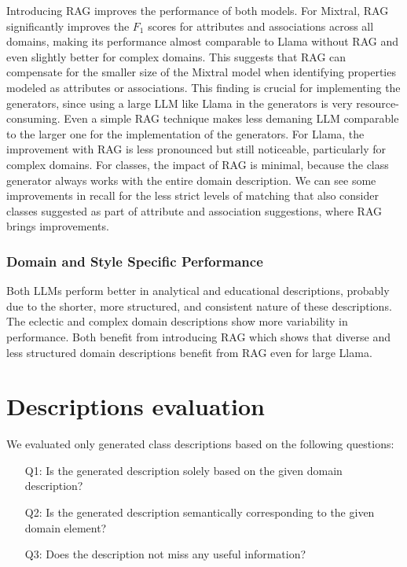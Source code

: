 Introducing RAG improves the performance of both models.
For Mixtral, RAG significantly improves the $F_1$ scores for attributes and associations across all domains, making its performance almost comparable to Llama without RAG and even slightly better for complex domains.
This suggests that RAG can compensate for the smaller size of the Mixtral model when identifying properties modeled as attributes or associations.
This finding is crucial for implementing the generators, since using a large LLM like Llama in the generators is very resource-consuming.
Even a simple RAG technique makes less demaning LLM comparable to the larger one for the implementation of the generators.
For Llama, the improvement with RAG is less pronounced but still noticeable, particularly for complex domains.
For classes, the impact of RAG is minimal, because the class generator always works with the entire domain description.
We can see some improvements in recall for the less strict levels of matching that also consider classes suggested as part of attribute and association suggestions, where RAG brings improvements.


\subsubsection{Domain and Style Specific Performance}

Both LLMs perform better in analytical and educational descriptions, probably due to the shorter, more structured, and consistent nature of these descriptions.
The eclectic and complex domain descriptions show more variability in performance.
Both benefit from introducing RAG which shows that diverse and less structured domain descriptions benefit from RAG even for large Llama.


\section{Descriptions evaluation}

We evaluated only generated class descriptions based on the following questions:

\begin{enumerate}
\item [Q1:] Is the generated description solely based on the given domain description?
\item [Q2:] Is the generated description semantically corresponding to the given domain element?
\item [Q3:] Does the description not miss any useful information?
\end{enumerate}

